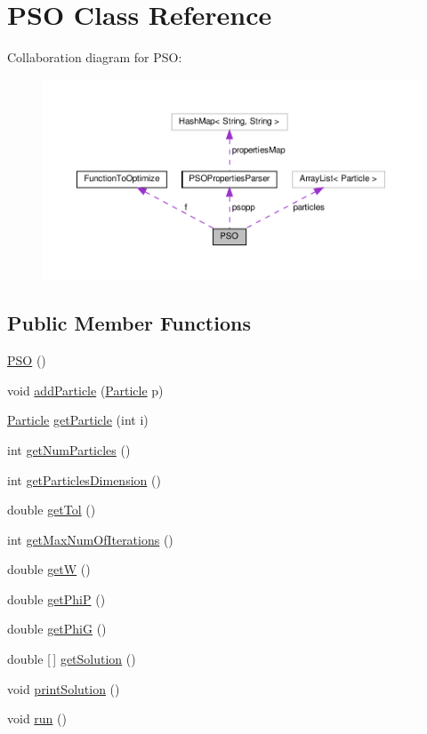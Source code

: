 \hypertarget{class_p_s_o}{}\section{P\+SO Class Reference}
\label{class_p_s_o}


Collaboration diagram for P\+SO\+:\nopagebreak
\begin{figure}[H]
\begin{center}
\leavevmode
\includegraphics[width=350pt]{class_p_s_o__coll__graph}
\end{center}
\end{figure}
\subsection*{Public Member Functions}
\begin{DoxyCompactItemize}
\item 
\hyperlink{class_p_s_o_a0aeec4970276a5e318b613e8a192064e}{P\+SO} ()
\item 
void \hyperlink{class_p_s_o_ac3676d8b4b6eb1fcb0c05a14a20af85c}{add\+Particle} (\hyperlink{class_particle}{Particle} p)
\item 
\hyperlink{class_particle}{Particle} \hyperlink{class_p_s_o_a3c697a11238d768ae2b1236d3cf6ea88}{get\+Particle} (int i)
\item 
int \hyperlink{class_p_s_o_acc2a16aac995a30f3265fa06182509af}{get\+Num\+Particles} ()
\item 
int \hyperlink{class_p_s_o_a46ddfeb9df3a42b2f1b2c4fe0d8f51b2}{get\+Particles\+Dimension} ()
\item 
double \hyperlink{class_p_s_o_a57be39727a5a7e22182c82d4274ba3ae}{get\+Tol} ()
\item 
int \hyperlink{class_p_s_o_a0d3cd48e829ba5ccb754e26f1890e51b}{get\+Max\+Num\+Of\+Iterations} ()
\item 
double \hyperlink{class_p_s_o_a50f5f8be53be944150317d590c411144}{getW} ()
\item 
double \hyperlink{class_p_s_o_a51bdbe662e545c50ac984abdba9f6448}{get\+PhiP} ()
\item 
double \hyperlink{class_p_s_o_a9ddf1bc2e611d1959fe4f6fdef960b0e}{get\+PhiG} ()
\item 
double \mbox{[}$\,$\mbox{]} \hyperlink{class_p_s_o_af3fe18f93011219d7fc3badc9220b54b}{get\+Solution} ()
\item 
void \hyperlink{class_p_s_o_a83a2cd74d2176ea147b84e17050ceffb}{print\+Solution} ()
\item 
void \hyperlink{class_p_s_o_a689d26e00d138c809a4de0a34e98cd0a}{run} ()
\end{DoxyCompactItemize}
